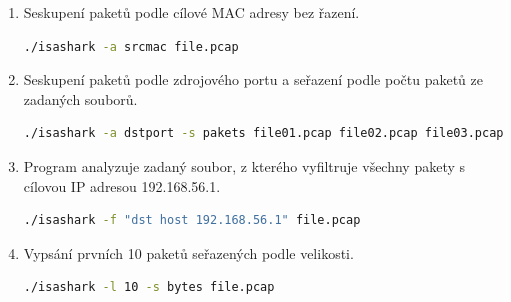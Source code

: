 \documentclass[11pt, a4paper]{article}
\begin{document}
\begin{enumerate}
\item Seskupení paketů podle cílové MAC adresy bez řazení.

\begin{lstlisting}[language=bash]
./isashark -a srcmac file.pcap
\end{lstlisting}

\item Seskupení paketů podle zdrojového portu a seřazení podle počtu paketů ze zadaných souborů.

\begin{lstlisting}[language=bash]
./isashark -a dstport -s pakets file01.pcap file02.pcap file03.pcap 
\end{lstlisting}

\item Program analyzuje zadaný soubor, z kterého vyfiltruje všechny pakety s cílovou IP adresou 192.168.56.1.

\begin{lstlisting}[language=bash]
./isashark -f "dst host 192.168.56.1" file.pcap 
\end{lstlisting}

\item Vypsání prvních 10 paketů seřazených podle velikosti.

\begin{lstlisting}[language=bash]
./isashark -l 10 -s bytes file.pcap 
\end{lstlisting}

\end{enumerate}
\newpage
\def\refname{Literatura}


\nocite{rfc:2460}
\end{document}
